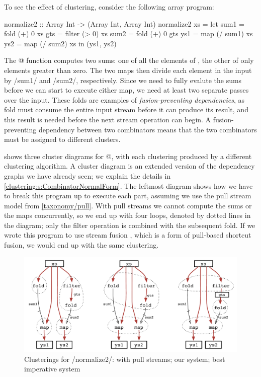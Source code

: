 To see the effect of clustering, consider the following array program:

\begin{haskell}
normalize2 :: Array Int -> (Array Int, Array Int)
normalize2 xs
 = let sum1 = fold   (+)  0   xs
       gts  = filter (>   0)  xs
       sum2 = fold   (+)  0   gts
       ys1  = map    (/ sum1) xs
       ys2  = map    (/ sum2) xs
   in (ys1, ys2)
\end{haskell}

The @ function computes two sums: one of all the elements of \Hs@xs@, the other of only elements greater than zero.
The two maps then divide each element in the input \Hs@xs@ by \Hs/sum1/ and \Hs/sum2/, respectively.
Since we need to fully evalute the sums before we can start to execute either map, we need at least two separate passes over the input.
These folds are examples of \emph{fusion-preventing dependencies}, as fold must consume the entire input stream before it can produce its result, and this result is needed before the next stream operation can begin.
A fusion-preventing dependency between two combinators means that the two combinators must be assigned to different clusters.

 shows three cluster diagrams for @, with each clustering produced by a different clustering algorithm.
A cluster diagram is an extended version of the dependency graphs we have already seen; we explain the details in \cref{clustering:s:CombinatorNormalForm}.
The leftmost diagram shows how we have to break this program up to execute each part, assuming we use the pull stream model from \cref{taxonomy/pull}.
With pull streams we cannot compute the sums or the maps concurrently, so we end up with four loops, denoted by dotted lines in the diagram; only the filter operation is combined with the subsequent fold.
If we wrote this program to use stream fusion \citep{coutts2007stream}, which is a form of pull-based shortcut fusion, we would end up with the same clustering.

\begin{figure}
\begin{center}
\includegraphics[scale=0.5]{copy/03-body/clustering/figures/ex1-compare.pdf}
\end{center}
\caption{Clusterings for \Hs/normalize2/: with pull streams; our system; best imperative system}
\label{clustering:f:normalize2-clusterings}
\end{figure}


